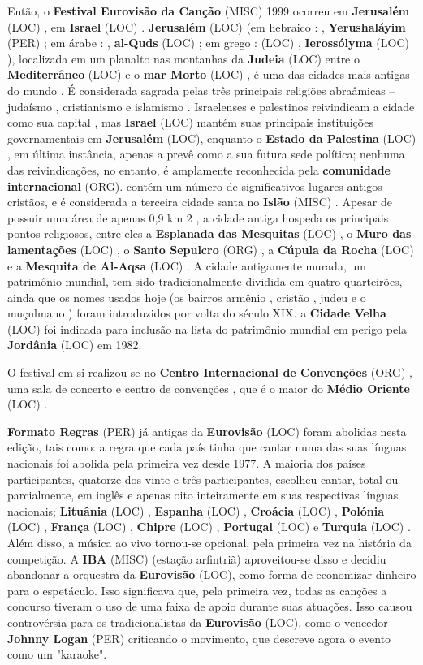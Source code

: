 \documentclass[12pt,a4paper]{article}
\begin{document}
Então, o \textbf{Festival Eurovisão da Canção} (MISC) 1999 ocorreu em \textbf{Jerusalém} (LOC) , em \textbf{Israel} (LOC) . \textbf{Jerusalém} (LOC) (em hebraico :  , \textbf{Yerushaláyim} (PER) ; em árabe :  , \textbf{al-Quds} (LOC) ; em grego : \textbf{} (LOC) , \textbf{Ierossólyma} (LOC) ), localizada em um planalto nas montanhas da \textbf{Judeia} (LOC) entre o \textbf{Mediterrâneo} (LOC) e o \textbf{mar Morto} (LOC) , é uma das cidades mais antigas do mundo . É considerada sagrada pelas três principais religiões abraâmicas -- judaísmo , cristianismo e islamismo . Israelenses e palestinos reivindicam a cidade como sua capital , mas \textbf{Israel} (LOC) mantém suas principais instituições governamentais em \textbf{Jerusalém} (LOC), enquanto o \textbf{Estado da Palestina} (LOC) , em última instância, apenas a prevê como a sua futura sede política; nenhuma das reivindicações, no entanto, é amplamente reconhecida pela \textbf{comunidade internacional} (ORG). contém um número de significativos lugares antigos cristãos, e é considerada a terceira cidade santa no \textbf{Islão} (MISC) . Apesar de possuir uma área de apenas 0,9 km 2 , a cidade antiga hospeda os principais pontos religiosos, entre eles a \textbf{Esplanada das Mesquitas} (LOC) , o \textbf{Muro das lamentações} (LOC) , o \textbf{Santo Sepulcro} (ORG) , a \textbf{Cúpula da Rocha} (LOC) e a \textbf{Mesquita de Al-Aqsa} (LOC) . A cidade antigamente murada, um patrimônio mundial, tem sido tradicionalmente dividida em quatro quarteirões, ainda que os nomes usados hoje (os bairros armênio , cristão , judeu e o muçulmano ) foram introduzidos por volta do século XIX. a \textbf{Cidade Velha} (LOC) foi indicada para inclusão na lista do patrimônio mundial em perigo pela \textbf{Jordânia} (LOC) em 1982.

O festival em si realizou-se no \textbf{Centro Internacional de Convenções} (ORG) , uma sala de concerto e centro de convenções , que é o maior do \textbf{Médio Oriente} (LOC) .



\textbf{Formato Regras} (PER) já antigas da \textbf{Eurovisão} (LOC) foram abolidas nesta edição, tais como: a regra que cada país tinha que cantar numa das suas línguas nacionais foi abolida pela primeira vez desde 1977. A maioria dos países participantes, quatorze dos vinte e três participantes, escolheu cantar, total ou parcialmente, em inglês e apenas oito inteiramente em suas respectivas línguas nacionais; \textbf{Lituânia} (LOC) , \textbf{Espanha} (LOC) , \textbf{Croácia} (LOC) , \textbf{Polónia} (LOC) , \textbf{França} (LOC) , \textbf{Chipre} (LOC) , \textbf{Portugal} (LOC) e \textbf{Turquia} (LOC) . Além disso, a música ao vivo tornou-se opcional, pela primeira vez na história da competição. A \textbf{IBA} (MISC) (estação arfintriã) aproveitou-se disso e decidiu abandonar a orquestra da \textbf{Eurovisão} (LOC), como forma de economizar dinheiro para o espetáculo. Isso significava que, pela primeira vez, todas as canções a concurso tiveram o uso de uma faixa de apoio durante suas atuações. Isso causou controvérsia para os tradicionalistas da \textbf{Eurovisão} (LOC), como o vencedor \textbf{Johnny Logan} (PER) criticando o movimento, que descreve agora o evento como um "karaoke".
\end{document}
